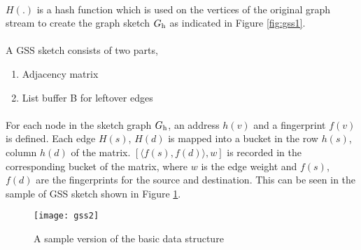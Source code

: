 \paragraph{}
\(H(.)\) is a hash function which is used on the vertices of the original graph stream to create the graph sketch \(G\textsubscript{h}\) as indicated in Figure \ref{fig:gss1}.

\paragraph{}
A GSS sketch consists of two parts,

\begin{enumerate}
    \item Adjacency matrix
    \item List buffer B for leftover edges
\end{enumerate}

\paragraph{}
For each node in the sketch graph \(G\textsubscript{h}\), an address \(h(v)\) and a fingerprint \(f(v)\) is defined. Each edge \(H(s)\), \(H(d)\) is mapped into a bucket in the row \(h(s)\), column \(h(d)\) of the matrix. \([\langle f(s), f(d)\rangle, w]\) is recorded in the corresponding bucket of the matrix, where \(w\) is the edge weight and \(f(s)\), \(f(d)\) are the fingerprints for the source and destination. This can be seen in the sample of GSS sketch shown in Figure \ref{fig:gss2}.

\begin{figure}[H]
    \centering
    \texttt{[image: gss2]}
    \caption{A sample version of the basic data structure\cite{gou_fast_2018}}
    \label{fig:gss2}
\end{figure}